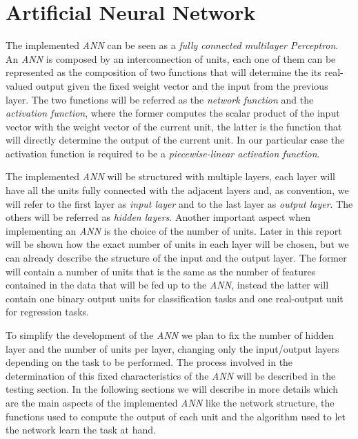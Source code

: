 \section{Artificial Neural Network}
The implemented \textit{ANN} can be seen as a \textit{fully connected multilayer Perceptron}. An \textit{ANN} is composed by an interconnection of units, each one of them can be represented as the composition of two functions that will determine the its real-valued output given the fixed weight vector and the input from the previous layer. The two functions will be referred as the \textit{network function} and the \textit{activation function}, where the former computes the scalar product of the input vector with the weight vector of the current unit, the latter is the function that will directly determine the output of the current unit. In our particular case the activation function is required to be a \textit{piecewise-linear activation function}.

The implemented \textit{ANN} will be structured with multiple layers, each layer will have all the units fully connected with the adjacent layers and, as convention, we will refer to the first layer as \textit{input layer} and to the last layer as \textit{output layer}. The others will be referred as \textit{hidden layers}. Another important aspect when implementing an \textit{ANN} is the choice of the number of units. Later in this report will be shown how the exact number of units in each layer will be chosen, but we can already describe the structure of the input and the output layer. The former will contain a number of units that is the same as the number of features contained in the data that will be fed up to the \textit{ANN}, instead the latter will contain one binary output units for classification tasks and one real-output unit for regression tasks.\newline

To simplify the development of the \textit{ANN} we plan to fix the number of hidden layer and the number of units per layer, changing only the input/output layers depending on the task to be performed. The process involved in the determination of this fixed characteristics of the \textit{ANN} will be described in the testing section.\newline
In the following sections we will describe in more details which are the main aspects of the implemented \textit{ANN} like the network structure, the functions used to compute the output of each unit and the algorithm used to let the network learn the task at hand.

